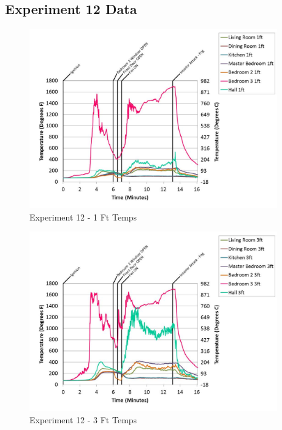 \documentclass{article}
\begin{document}
\begin{appendices}
	\clearpage

		\clearpage
\clearpage		\large
\subsection{Experiment 12 Data} \label{App:Exp12Results} 

	\begin{figure}[h!]
		\centering
		\includegraphics[height=3.05in]{0_Images/Results_Charts/Exp_12_Charts/1FtTemps.pdf}
		\caption{Experiment 12 - 1 Ft Temps}
	\end{figure}
 

	\begin{figure}[h!]
		\centering
		\includegraphics[height=3.05in]{0_Images/Results_Charts/Exp_12_Charts/3FtTemps.pdf}
		\caption{Experiment 12 - 3 Ft Temps}
	\end{figure}
 
	\clearpage


\end{appendices}
\end{document}
